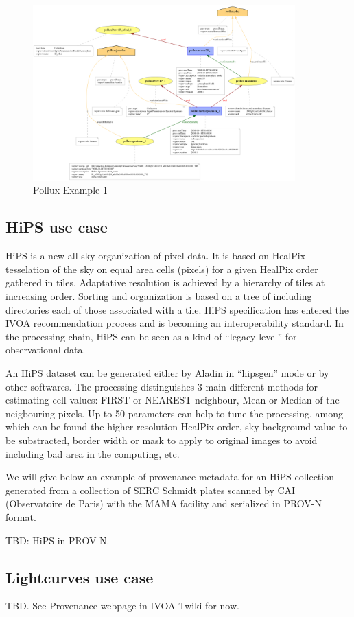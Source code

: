 \begin{figure}
\centering
\includegraphics[width=0.9\textwidth]{usecase_Pollux_example1.png}
\caption{Pollux Example 1}
\label{fig:pollux}
\end{figure}

\subsection{HiPS use case}
HiPS is a new all sky organization of pixel data. It is based on HealPix tesselation of the sky on equal area cells (pixels) for a given HealPix order gathered in tiles. Adaptative resolution is achieved by a hierarchy of tiles at increasing order. Sorting and organization is based on a tree of including directories each of those associated with a tile. HiPS specification has entered the IVOA recommendation process and is becoming an interoperability standard.
In the processing chain, HiPS can be seen as a kind of ``legacy level'' for observational data.

An HiPS dataset can be generated either by Aladin in ``hipsgen'' mode or by other softwares.  The processing distinguishes 3 main different methods for estimating cell values: FIRST or NEAREST neighbour, Mean or Median of the neigbouring pixels. Up to 50 parameters can help to tune the processing, among which can be found the higher resolution HealPix order, sky background value to be substracted, border width or mask to apply to original images to avoid including bad area in the computing, etc.

We will give below an example of provenance metadata for an HiPS collection generated from a collection of SERC Schmidt plates scanned by CAI (Observatoire de Paris) with the MAMA facility and serialized in PROV-N format.

TBD: HiPS in PROV-N.

\subsection{Lightcurves use case}
TBD. See Provenance webpage in IVOA Twiki for now.
